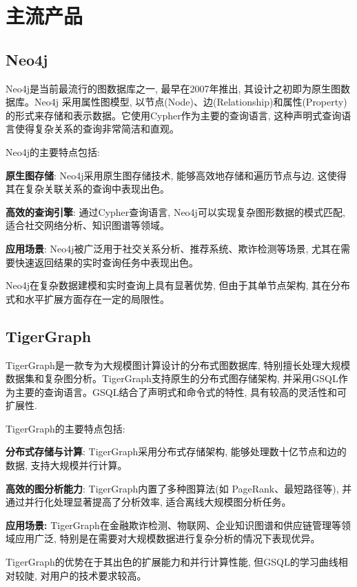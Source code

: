 \section{主流产品}

\subsection{Neo4j}

Neo4j是当前最流行的图数据库之一, 最早在2007年推出, 其设计之初即为原生图数据库。Neo4j 采用属性图模型, 以节点(Node)、边(Relationship)和属性(Property)的形式来存储和表示数据。它使用Cypher作为主要的查询语言, 这种声明式查询语言使得复杂关系的查询非常简洁和直观。

Neo4j的主要特点包括:

\textbf{原生图存储}: Neo4j采用原生图存储技术, 能够高效地存储和遍历节点与边, 这使得其在复杂关联关系的查询中表现出色。

\textbf{高效的查询引擎}: 通过Cypher查询语言, Neo4j可以实现复杂图形数据的模式匹配, 适合社交网络分析、知识图谱等领域。

\textbf{应用场景}: Neo4j被广泛用于社交关系分析、推荐系统、欺诈检测等场景, 尤其在需要快速返回结果的实时查询任务中表现出色。

Neo4j在复杂数据建模和实时查询上具有显著优势, 但由于其单节点架构, 其在分布式和水平扩展方面存在一定的局限性。


\subsection{TigerGraph}

TigerGraph是一款专为大规模图计算设计的分布式图数据库, 特别擅长处理大规模数据集和复杂图分析。TigerGraph支持原生的分布式图存储架构, 并采用GSQL作为主要的查询语言。GSQL结合了声明式和命令式的特性, 具有较高的灵活性和可扩展性.

TigerGraph的主要特点包括:

\textbf{分布式存储与计算}: TigerGraph采用分布式存储架构, 能够处理数十亿节点和边的数据, 支持大规模并行计算。

\textbf{高效的图分析能力}: TigerGraph内置了多种图算法(如 PageRank、最短路径等), 并通过并行化处理显著提高了分析效率, 适合离线大规模图分析任务。

\textbf{应用场景:} TigerGraph在金融欺诈检测、物联网、企业知识图谱和供应链管理等领域应用广泛, 特别是在需要对大规模数据进行复杂分析的情况下表现优异。

TigerGraph的优势在于其出色的扩展能力和并行计算性能, 但GSQL的学习曲线相对较陡, 对用户的技术要求较高。


